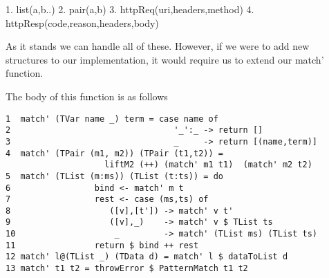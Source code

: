 \label{list:patterns}
\begin{code}
    1. list(a,b..)
    2. pair(a,b)
    3. httpReq(uri,headers,method)
    4. httpResp(code,reason,headers,body)
\end{code}

As it stands we can handle all of these. However, if we were to add new structures to our implementation, it would require us to extend our match' function. 

The body of this function is as follows
\begin{verbatim}
1  match' (TVar name _) term = case name of                                                
2                                 '_':_ -> return []
3                                 _     -> return [(name,term)]
4  match' (TPair (m1, m2)) (TPair (t1,t2)) = 
                    liftM2 (++) (match' m1 t1)  (match' m2 t2)
5  match' (TList (m:ms)) (TList (t:ts)) = do
6                 bind <- match' m t
7                 rest <- case (ms,ts) of
8                    ([v],[t']) -> match' v t'
9                    ([v],_)    -> match' v $ TList ts
10                    _         -> match' (TList ms) (TList ts)
11                return $ bind ++ rest
12 match' l@(TList _) (TData d) = match' l $ dataToList d
13 match' t1 t2 = throwError $ PatternMatch t1 t2
\end{verbatim}

